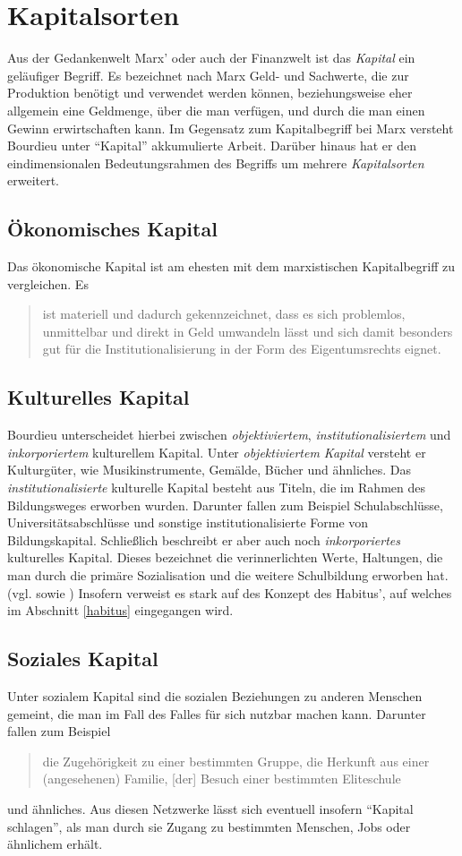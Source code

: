 \documentclass[a4paper, german, oneside]{scrbook}
\begin{document}
\section{Kapitalsorten}
Aus der Gedankenwelt Marx' oder auch der Finanzwelt ist das \emph{Kapital} ein geläufiger Begriff. Es bezeichnet nach Marx Geld- und Sachwerte, die zur Produktion benötigt und verwendet werden können, beziehungsweise eher allgemein eine Geldmenge, über die man verfügen, und durch die man einen Gewinn erwirtschaften kann. \parencite{Kapital} Im Gegensatz zum Kapitalbegriff bei Marx versteht Bourdieu unter \enquote{Kapital} akkumulierte Arbeit. \parencite[vgl.][86]{luthje_medium_2008} Darüber hinaus hat er den eindimensionalen Bedeutungsrahmen des Begriffs um mehrere \emph{Kapitalsorten} erweitert. 


\subsection{Ökonomisches Kapital}
Das ökonomische Kapital ist am ehesten mit dem marxistischen Kapitalbegriff zu vergleichen. Es \blockquote[{\cite[86]{luthje_medium_2008}}]{ist materiell und dadurch gekennzeichnet, dass es sich problemlos, unmittelbar und direkt in Geld umwandeln lässt und sich damit besonders gut für die Institutionalisierung in der Form des Eigentumsrechts eignet.}

\subsection{Kulturelles Kapital}
Bourdieu unterscheidet hierbei zwischen \emph{objektiviertem}, \emph{institutionalisiertem} und \emph{inkorporiertem} kulturellem Kapital. Unter \emph{objektiviertem Kapital} versteht er Kulturgüter, wie Musikinstrumente, Gemälde, Bücher und ähnliches. Das \emph{institutionalisierte} kulturelle Kapital besteht aus Titeln, die im Rahmen des Bildungsweges erworben wurden. Darunter fallen zum Beispiel Schulabschlüsse, Universitätsabschlüsse und sonstige institutionalisierte Forme von Bildungskapital. Schließlich beschreibt er aber auch noch \emph{inkorporiertes} kulturelles Kapital. Dieses bezeichnet die verinnerlichten Werte, Haltungen, die man durch die primäre Sozialisation und die weitere Schulbildung erworben hat. (vgl. \cite[539f.]{joas_sozialtheorie:_2004} sowie \cite[86f.]{luthje_medium_2008}) Insofern verweist es stark auf des Konzept des Habitus', auf welches im Abschnitt \ref{habitus} eingegangen wird.

\subsection{Soziales Kapital}
Unter sozialem Kapital sind die sozialen Beziehungen zu anderen Menschen gemeint, die man im Fall des Falles für sich nutzbar machen kann. Darunter fallen zum Beispiel \blockquote[{\cite[540]{joas_sozialtheorie:_2004}}]{die Zugehörigkeit zu einer bestimmten Gruppe, die Herkunft aus einer (angesehenen) Familie, [der] Besuch einer bestimmten Eliteschule} und ähnliches. Aus diesen Netzwerke lässt sich eventuell insofern \enquote{Kapital schlagen}, als man durch sie Zugang zu bestimmten Menschen, Jobs oder ähnlichem erhält.
\end{document}
